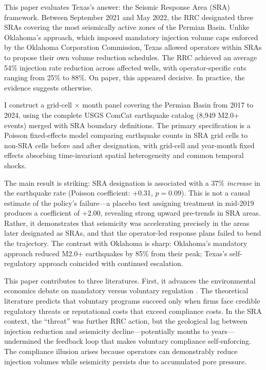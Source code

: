 \documentclass[12pt]{article}
\begin{document}
This paper evaluates Texas's answer: the Seismic Response Area (SRA) framework. Between September 2021 and May 2022, the RRC designated three SRAs covering the most seismically active zones of the Permian Basin. Unlike Oklahoma's approach, which imposed mandatory injection volume caps enforced by the Oklahoma Corporation Commission, Texas allowed operators within SRAs to propose their own volume reduction schedules. The RRC achieved an average 54\% injection rate reduction across affected wells, with operator-specific cuts ranging from 25\% to 88\%. On paper, this appeared decisive. In practice, the evidence suggests otherwise.

I construct a grid-cell $\times$ month panel covering the Permian Basin from 2017 to 2024, using the complete USGS ComCat earthquake catalog (8,949 M2.0+ events) merged with SRA boundary definitions. The primary specification is a Poisson fixed-effects model comparing earthquake counts in SRA grid cells to non-SRA cells before and after designation, with grid-cell and year-month fixed effects absorbing time-invariant spatial heterogeneity and common temporal shocks.

The main result is striking: SRA designation is associated with a 37\% \textit{increase} in the earthquake rate (Poisson coefficient: +0.31, $p = 0.09$). This is not a causal estimate of the policy's failure---a placebo test assigning treatment in mid-2019 produces a coefficient of +2.00, revealing strong upward pre-trends in SRA areas. Rather, it demonstrates that seismicity was accelerating precisely in the areas later designated as SRAs, and that the operator-led response plans failed to bend the trajectory. The contrast with Oklahoma is sharp: Oklahoma's mandatory approach reduced M2.0+ earthquakes by 85\% from their peak; Texas's self-regulatory approach coincided with continued escalation.

This paper contributes to three literatures. First, it advances the environmental economics debate on mandatory versus voluntary regulation \citep{lyon2004corporate, segerson1998voluntary, decker2003economics, maxwell2000self, khanna2001non}. The theoretical literature predicts that voluntary programs succeed only when firms face credible regulatory threats or reputational costs that exceed compliance costs. In the SRA context, the ``threat'' was further RRC action, but the geological lag between injection reduction and seismicity decline---potentially months to years---undermined the feedback loop that makes voluntary compliance self-enforcing. The compliance illusion arises because operators can demonstrably reduce injection volumes while seismicity persists due to accumulated pore pressure.
\end{document}
